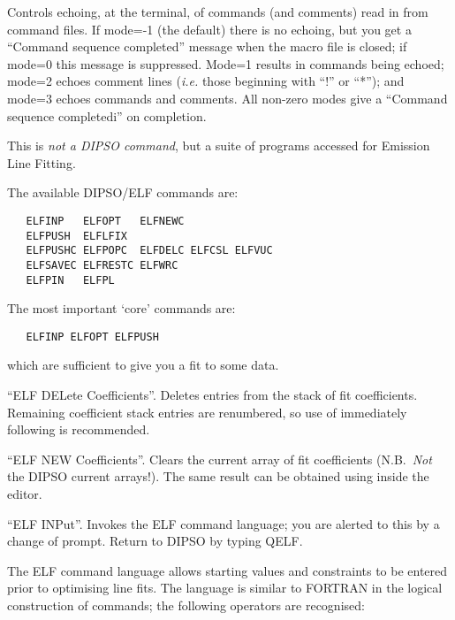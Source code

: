 \begin {description}
Controls echoing, at the terminal, of commands (and comments) read in
from command files. If mode=-1 (the default) there is no echoing, but
you get a ``Command sequence completed'' message when the macro file is
closed; if mode=0 this message is suppressed. Mode=1 results in
commands being echoed; mode=2 echoes comment lines ({\em i.e.} those
beginning with ``!'' or ``*''); and mode=3 echoes commands and
comments. All non-zero modes give a ``Command sequence completedi''
on completion.

This is {\em not a DIPSO command}, but a suite of programs accessed for
Emission Line Fitting.

The available DIPSO/ELF commands are:

\begin{verbatim}
   ELFINP   ELFOPT   ELFNEWC
   ELFPUSH  ELFLFIX
   ELFPUSHC ELFPOPC  ELFDELC ELFCSL ELFVUC
   ELFSAVEC ELFRESTC ELFWRC
   ELFPIN   ELFPL
\end{verbatim}

The most important `core' commands are:

\begin{verbatim}
   ELFINP ELFOPT ELFPUSH
\end{verbatim}

which are sufficient to give you a fit to some data.

``ELF DELete Coefficients''. Deletes entries from the stack of fit
coefficients. Remaining coefficient stack entries are renumbered, so
use of   immediately following   is recommended.

``ELF NEW Coefficients''. Clears the current array of fit coefficients
(N.B.\ {\em Not} the DIPSO current arrays!). The same result can be
obtained using   inside the   editor.

``ELF INPut''. Invokes the ELF command language; you are alerted to
this by a change of prompt. Return to DIPSO by typing QELF.

The ELF command language allows starting values and constraints to be
entered prior to optimising line fits. The language is similar to
FORTRAN in the logical construction of commands; the following
operators are recognised:


\end{description}
